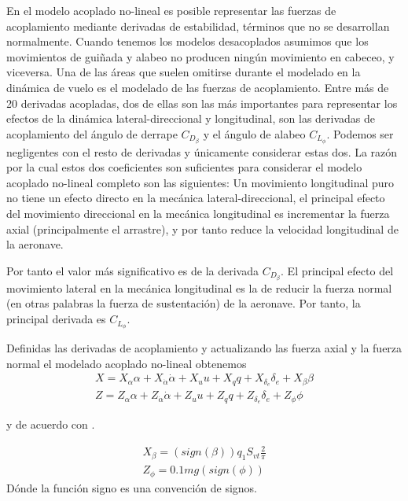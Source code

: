 En el modelo acoplado no-lineal es posible representar las fuerzas de acoplamiento mediante derivadas de estabilidad, términos que no se desarrollan normalmente. 
Cuando tenemos los modelos desacoplados asumimos que los movimientos de guiñada y alabeo no producen ningún movimiento en cabeceo, y viceversa. 
Una de las áreas que suelen omitirse durante el modelado en la dinámica de vuelo es el modelado de las fuerzas de acoplamiento. Entre más de 20 derivadas acopladas, dos de ellas son las más importantes para representar los efectos de la dinámica lateral-direccional y longitudinal, son las derivadas de acoplamiento del ángulo de derrape $C_{D_{\beta}}$ y el ángulo de alabeo $C_{L_{\phi}}$. Podemos ser negligentes con el resto de derivadas y únicamente considerar estas dos. 
La razón por la cual estos dos coeficientes son suficientes para considerar el modelo acoplado no-lineal completo son las siguientes: 
Un movimiento longitudinal puro no tiene un efecto directo en la mecánica lateral-direccional, el principal efecto del movimiento direccional en la mecánica longitudinal es incrementar la fuerza axial (principalmente el arrastre), y por tanto reduce la velocidad longitudinal de la aeronave.

Por tanto el valor más significativo es de la derivada $C_{D_{\beta}}$.
El principal efecto del movimiento lateral en la mecánica longitudinal es la de reducir la fuerza normal (en otras palabras la fuerza de sustentación) de la aeronave. Por tanto, la principal derivada es $C_{L_{\phi}}$. 

Definidas las derivadas de acoplamiento y actualizando las fuerza axial y  la fuerza normal el modelado acoplado no-lineal obtenemos
\begin{gather}
    X = X_{\alpha} \alpha + X_{\dot \alpha}\dot \alpha + X_{u} u + X_{q} q + X_{\delta_{e}} \delta_{e} + X_{\beta} \beta \\
    Z = Z_{\alpha} \alpha + Z_{\dot \alpha}\dot \alpha + Z_{u} u + Z_{q} q + Z_{\delta_{e}} \delta_{e} + Z_{\phi} \phi
\end{gather}

y de acuerdo con \cite{Mohammad2020}. 

\begin{gather}
    X_{\beta} = (sign(\beta))q_{1}S_{vt}\frac{2}{\pi} \\
    Z_{\phi} = 0.1 mg (sign(\phi))
\end{gather}
Dónde la función signo es una convención de signos. 

